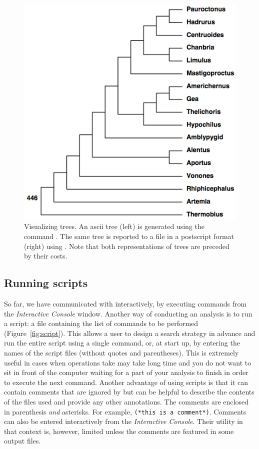 \begin{figure}
\begin{minipage}[c]{0.5\textwidth}
	   	\includegraphics[width=\textwidth]{figures/pstree.jpg}
   	\end{minipage}
\caption{Visualizing trees. An ascii tree (left) is generated using the command . The same tree is reported to a file in a postscript format (right) using . Note that both representations of trees  are preceded by their costs.}
\label{fig:trees}
\end{figure}

\subsection{Running scripts}

So far, we have communicated with \poy interactively, by executing commands from the \emph{Interactive Console} window. Another way of conducting an analysis is to run a script: a file containing the list of commands to be performed (Figure~\ref{fig:script}). This allows a user to design a search strategy in advance and run the entire script using a single command,  or, at start up, by entering the names of the script files (without quotes and parentheses). This is extremely useful in cases when operations take may take long time and you do not want to sit in front of the computer waiting for a part of your analysis to finish in order to execute the next command. Another advantage of using scripts is that it can contain comments that are ignored by \poy but can be helpful to describe the contents of the files used and provide any other annotations. The comments are enclosed in parenthesis \emph{and} asterisks. For example, \texttt{(*this is a comment*)}. Comments can also be entered interactively from the \emph{Interactive Console}. Their utility in that context is, however, limited unless the comments are featured in some output files.

